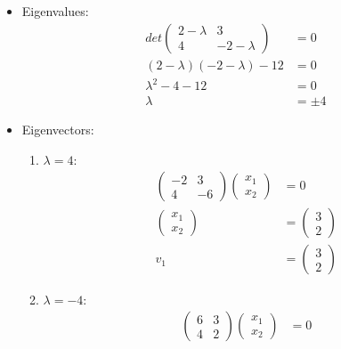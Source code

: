 \begin{itemize}
    \item Eigenvalues:
    \begin{displaymath}
        \begin{aligned}
            det \begin{pmatrix} 2 - \lambda & 3 \\ 4 & -2 - \lambda \end{pmatrix} & = 0 \\
            (2 - \lambda)(-2 - \lambda) - 12 & = 0 \\
            \lambda^2 - 4 - 12 & = 0 \\
            \lambda & = \pm 4
        \end{aligned}
    \end{displaymath}
    \item Eigenvectors:
        \begin{enumerate}
            \item $\lambda = 4$:
                \begin{displaymath}
                    \begin{aligned}
                        \begin{pmatrix} -2 & 3 \\ 4 & -6 \end{pmatrix} \begin{pmatrix} x_1 \\ x_2 \end{pmatrix} & = 0 \\
                        \begin{pmatrix} x_1 \\ x_2 \end{pmatrix} & = \begin{pmatrix} 3 \\ 2 \end{pmatrix} \\
                        v_1 & = \begin{pmatrix} 3 \\ 2 \end{pmatrix}
                    \end{aligned}
                \end{displaymath}
            \item $\lambda = -4$:
                \begin{displaymath}
                    \begin{aligned}
                        \begin{pmatrix} 6 & 3 \\ 4 & 2 \end{pmatrix} \begin{pmatrix} x_1 \\ x_2 \end{pmatrix} & = 0 \\

\end{aligned}
\end{displaymath}
\end{enumerate}
\end{itemize}
